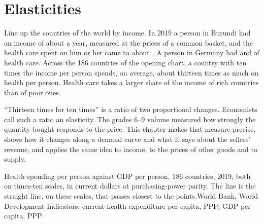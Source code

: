 \chapter{Elasticities}\label{ch:g10:elasticities}

Line up the countries of the world by income. In 2019 a person in Burundi had an income of about  a year, measured
at the prices of a common basket, and the health care spent on him or her came to about . A person in Germany had
 and  of health care. Across the 186 countries of the opening chart, a country with ten times the income
per person spends, on average, about thirteen times as much on health per person. Health care takes a larger share of the income
of rich countries than of poor ones.

``Thirteen times for ten times'' is a ratio of two proportional changes. Economists call such a ratio an elasticity. The grades 6--9
volume measured how strongly the quantity bought responds to the price. This chapter makes that measure precise, shows how it changes
along a demand curve and what it says about the sellers' revenue, and applies the same idea to income, to the prices of other goods
and to supply.

\begin{openingchart}{Health spending per person against GDP per person, 186 countries, 2019, both on times-ten scales, in current
dollars at purchasing-power parity. The line is the straight line, on these scales, that passes closest to the points.}{World Bank,
World Development Indicators: current health expenditure per capita, PPP; GDP per capita, PPP}
\end{openingchart}


